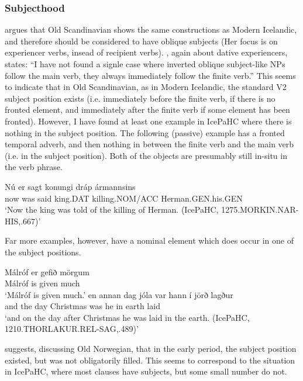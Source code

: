 \subsubsection{Subjecthood}
\cite{Bardal.1997,Bardal.1998,Bardal.2000,Bardal.2001} argues that Old Scandinavian shows the same constructions as Modern Icelandic, and therefore should be considered to have oblique subjects (Her focus is on experiencer verbs, insead of recipient verbs). \cite{Rognvaldsson.1991}, again about dative experiencers, states: ``I have not found a signle case where inverted oblique subject-like NPs follow the main verb, they always immediately follow the finite verb.'' This seems to indicate that in Old Scandinavian, as in Modern Icelandic, the standard V2 subject position exists (i.e. immediately before the finite verb, if there is no fronted element, and immediately after the finite verb if some element has been fronted). However, I have found at least one example in IcePaHC where there is nothing in the subject position. The following (passive) example has a fronted temporal adverb, and then nothing in between the finite verb and the main verb (i.e. in the subject position). Both of the objects are presumably still in-situ in the verb phrase.
\begin{exe}
\ex \gll Nú er sagt konungi dráp ármannsins\\
now was said king.DAT killing.NOM/ACC Herman.GEN.his.GEN\\
\trans `Now the king was told of the killing of Herman. (IcePaHC, 1275.MORKIN.NAR-HIS,.667)'
\end{exe}
Far more examples, however, have a nominal element which does occur in one of the subject positions. 
\begin{exe}
\ex
\begin{xlist}
\ex \gll Málróf er gefið mörgum\\
Málróf is given much\\
\trans `Málróf is given much.'
\ex \gll en annan dag jóla var hann í jörð lagður\\
and the day Christmas was he in earth laid\\
\trans `and on the day after Christmas he was laid in the earth. (IcePaHC, 1210.THORLAKUR.REL-SAG,.489)'  
\end{xlist}
\end{exe}
 \cite{Kinn.2010} suggests, discussing Old Norwegian, that in the early period, the subject position existed, but was not obligatorily filled. This seems to correspond to the situation in IcePaHC, where most clauses have subjects, but some small number do not.
